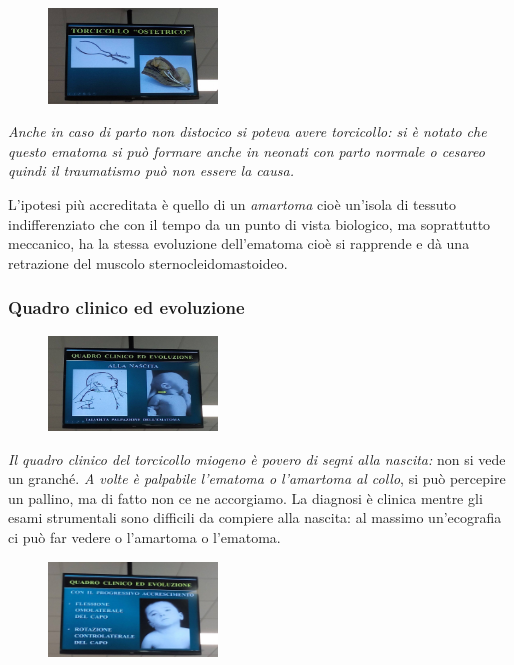 \begin{figure}[!ht]
\centering
\includegraphics[width=0.4\textwidth]{013/image22.jpeg}
\end{figure}

\emph{Anche in caso di parto non distocico si poteva avere torcicollo: si è notato che questo ematoma si può formare anche in neonati con parto normale o cesareo quindi il traumatismo può non essere la causa.}

L'ipotesi più accreditata è quello di un \emph{amartoma} cioè un'isola di tessuto indifferenziato che con il tempo da un punto di vista biologico, ma soprattutto meccanico, ha la stessa evoluzione dell'ematoma cioè si rapprende e dà una retrazione del muscolo sternocleidomastoideo.

\subsubsection{Quadro clinico ed evoluzione}

\begin{figure}[!ht]
\centering
\includegraphics[width=0.4\textwidth]{013/image23.jpeg}
\end{figure}

\emph{Il quadro clinico del torcicollo miogeno è povero di segni alla nascita:} non si vede un granché. \emph{A volte è palpabile l'ematoma o l'amartoma al collo}, si può percepire un pallino, ma di fatto non ce ne accorgiamo. La diagnosi è clinica mentre gli esami strumentali sono difficili da compiere alla nascita: al massimo un'ecografia ci può far vedere o l'amartoma o l'ematoma.

\begin{figure}[!ht]
\centering
\includegraphics[width=0.4\textwidth]{013/image24.jpeg}
\end{figure}

